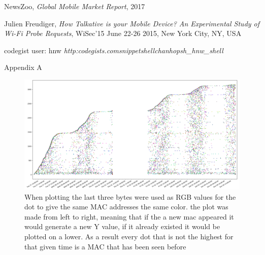 \documentclass[conference,compsoc]{IEEEtran}
\begin{document}

%
%
%
\begin{thebibliography}{1}

NewsZoo, \emph{Global Mobile Market Report}, 2017

Julien Freudiger, \emph{How Talkative is your Mobile Device? An Experimental Study of Wi-Fi Probe Requests}, WiSec’15 June 22-26 2015, New York City, NY, USA

codegist user: hnw \emph{http:\/\/codegists.com\/snippet\/shell\/chanhopsh\_hnw\_shell}

\end{thebibliography}

\onecolumn

{Appendix A}


\begin{figure}[h!]
    \centering
    \includegraphics[width=1\textwidth]{img/Macovertime.png} 
    \caption{When plotting the last three bytes were used as RGB values for the dot to give the same MAC addresses the same color. the plot was made from left to right, meaning that if the a new mac appeared it would generate a new Y value, if it already existed it would be plotted on a lower. As a result every dot that is not the highest for that given time is a MAC that has been seen before }
    \label{fig:mactime}
\end{figure}





\end{document}

